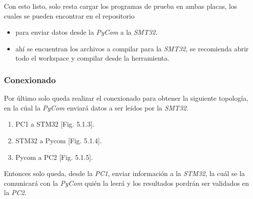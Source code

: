 \documentclass[12pt]{article}
\begin{document}
Con esto listo, solo resta cargar los programas de prueba en ambas placas, los cuales se pueden encontrar en el repositorio
\begin{itemize}
\item {} para enviar datos desde la \textit{PyCom} a la \textit{SMT32}.
\item {} ahí se encuentran los archivos a compilar para la \textit{SMT32}, se recomienda abrir todo el workspace y compilar desde la herramienta.
\end{itemize}

\subsubsection{Conexionado}

Por último solo queda realizar el conexionado para obtener la siguiente topología, en la cúal la \textit{PyCom} enviará datos a ser leídos por la \textit{SMT32}. 

\begin{enumerate}
  \item PC1 a STM32 [Fig. 5.1.3].
  \item STM32 a Pycom  [Fig. 5.1.4].
  \item Pycom a PC2 [Fig. 5.1.5].
\end{enumerate}

Entonces solo queda, desde la \textit{PC1}, enviar información a la \textit{STM32}, la cuál se la comunicará con la \textit{PyCom} quién la leerá y los resultados pordrán ser validados en la \textit{PC2}.
\end{document}
